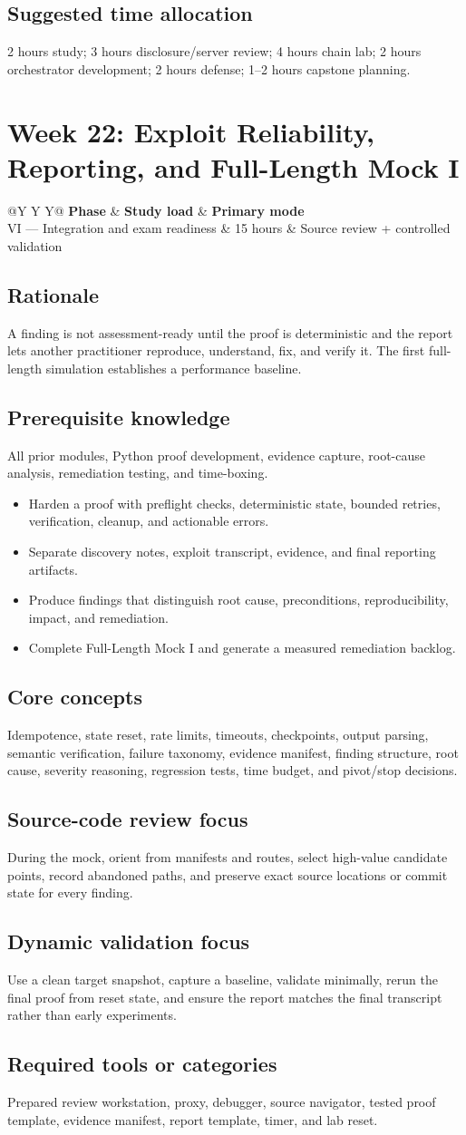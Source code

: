 \documentclass[11pt]{article}
\makeatletter
\newcommand{\weekheader}[4]{%
  \clearpage
  \section{Week #1: #2}
  \begin{tcolorbox}[colback=Navy,colframe=Navy,coltext=white]
    \begin{tabularx}{\linewidth}{@{}Y Y Y@{}}
      \textbf{Phase} & \textbf{Study load} & \textbf{Primary mode}\\
      #3 & #4 hours & Source review + controlled validation
    \end{tabularx}
  \end{tcolorbox}
}
\newcommand{\weekfield}[2]{%
  \Needspace{5\baselineskip}
  \subsection*{#1}
  #2
}
\makeatother
\begin{document}
\weekfield{Suggested time allocation}{2 hours study; 3 hours disclosure/server
review; 4 hours chain lab; 2 hours orchestrator development; 2 hours defense; 1--2
hours capstone planning.}

\weekheader{22}{Exploit Reliability, Reporting, and Full-Length Mock I}{VI --- Integration and exam readiness}{15}

\weekfield{Rationale}{A finding is not assessment-ready until the proof is
deterministic and the report lets another practitioner reproduce, understand, fix,
and verify it. The first full-length simulation establishes a performance baseline.}

\weekfield{Prerequisite knowledge}{All prior modules, Python proof development,
evidence capture, root-cause analysis, remediation testing, and time-boxing.}

\begin{objectivebox}
\begin{itemize}
  \item Harden a proof with preflight checks, deterministic state, bounded retries, verification, cleanup, and actionable errors.
  \item Separate discovery notes, exploit transcript, evidence, and final reporting artifacts.
  \item Produce findings that distinguish root cause, preconditions, reproducibility, impact, and remediation.
  \item Complete Full-Length Mock I and generate a measured remediation backlog.
\end{itemize}
\end{objectivebox}

\weekfield{Core concepts}{Idempotence, state reset, rate limits, timeouts,
checkpoints, output parsing, semantic verification, failure taxonomy, evidence
manifest, finding structure, root cause, severity reasoning, regression tests,
time budget, and pivot/stop decisions.}

\weekfield{Source-code review focus}{During the mock, orient from manifests and
routes, select high-value candidate points, record abandoned paths, and preserve
exact source locations or commit state for every finding.}

\weekfield{Dynamic validation focus}{Use a clean target snapshot, capture a
baseline, validate minimally, rerun the final proof from reset state, and ensure
the report matches the final transcript rather than early experiments.}

\weekfield{Required tools or categories}{Prepared review workstation, proxy,
debugger, source navigator, tested proof template, evidence manifest, report
template, timer, and lab reset.}
\end{document}
